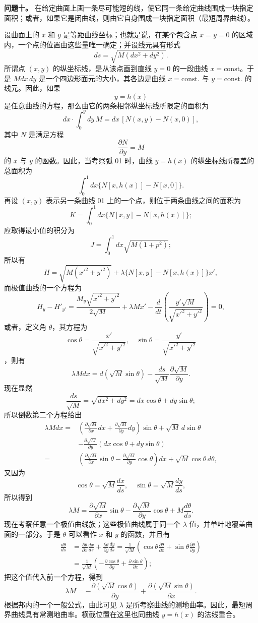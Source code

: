 \documentclass[11pt,a4paper,leqno]{article}
\begin{document}
\medskip
\noindent\textbf{问题十。} 在给定曲面上画一条尽可能短的线，使它同一条给定曲线围成一块指定面积；或者，如果它是闭曲线，则由它自身围成一块指定面积（最短周界曲线）。

设曲面上的 $x$ 和 $y$ 是等距曲线坐标；也就是说，在某个包含点 $x=y=0$ 的区域内，一个点的位置由这些量唯一确定；并设线元具有形式
\[
ds=\sqrt{M(dx^2+dy^2)}.
\]
所谓点 $(x,y)$ 的纵坐标线，是从该点画到直线 $y=0$ 的一段曲线 $x=\mathrm{const}$。于是 $Mdx\,dy$ 是一个四边形面元的大小，其各边是曲线 $x=\mathrm{const}.$ 与 $y=\mathrm{const}.$ 的线元。因此，如果
\[
y=h(x)
\]
是任意曲线的方程，那么由它的两条相邻纵坐标线所限定的面积为
\[
dx\cdot\int_0^ydy\,M=dx\,[N(x,y)-N(x,0)],
\]
其中 $N$ 是满足方程
\[
\frac{\partial N}{\partial y}=M
\]
的 $x$ 与 $y$ 的函数。因此，当考察弧 01 时，曲线 $y=h(x)$ 的纵坐标线所覆盖的总面积为
\[
\int_0^1dx\{N[x,h(x)]-N[x,0]\}.
\]
再设 $(x,y)$ 表示另一条曲线 01 上的一个点，则位于两条曲线之间的面积为
\[
K=\int_0^1dx\{N[x,y]-N[x,h(x)]\};
\]
应取得最小值的积分为
\[
J=\int_0^1dx\sqrt{M(1+p^2)};
\]
所以有
\[
H=\sqrt{M(x'^2+y'^2)}+\lambda\{N[x,y]-N[x,h(x)]\}x',
\]
而极值曲线的一个方程为
\[
H_y-H'_{y'}=\frac{M_y\sqrt{x'^2+y'^2}}{2\sqrt{M}}+
\lambda Mx'-\frac{d}{dt}\left(\frac{y'\sqrt{M}}{\sqrt{x'^2+y'^2}}\right)=0,
\]
或者，定义角 $\theta$，其方程为
\[
\cos\theta=\frac{x'}{\sqrt{x'^2+y'^2}},
\quad
\sin\theta=\frac{y'}{\sqrt{x'^2+y'^2}}
\]
，则有
\[
\lambda Mdx=d(\sqrt{M}\sin\theta)-\frac{ds}{\sqrt{M}}\frac{\partial\sqrt{M}}{\partial y}.
\]
现在显然
\[
\frac{ds}{\sqrt{M}}=\sqrt{dx^2+dy^2}=dx\cos\theta+dy\sin\theta;
\]
所以倒数第二个方程给出
\[
\begin{aligned}
\lambda Mdx={}&\left(\frac{\partial\sqrt{M}}{\partial x}dx+\frac{\partial\sqrt{M}}{\partial y}dy\right)\sin\theta
+\sqrt{M}\,d\sin\theta\\
&-\frac{\partial\sqrt{M}}{\partial y}(dx\cos\theta+dy\sin\theta)\\
={}&\left(\frac{\partial\sqrt{M}}{\partial x}\sin\theta-\frac{\partial\sqrt{M}}{\partial y}\cos\theta\right)dx+
\sqrt{M}\cos\theta\,d\theta,
\end{aligned}
\]
又因为
\[
\cos\theta=\sqrt{M}\frac{dx}{ds},
\quad
\sin\theta=\sqrt{M}\frac{dy}{ds},
\]
所以得到
\[
\lambda M=\frac{\partial\sqrt{M}}{\partial x}\sin\theta-
\frac{\partial\sqrt{M}}{\partial y}\cos\theta+M\frac{d\theta}{ds}.
\]
现在考察任意一个极值曲线族；这些极值曲线属于同一个 $\lambda$ 值，并单叶地覆盖曲面的一部分。于是 $\theta$ 可以看作 $x$ 和 $y$ 的函数，并且有
\[
\begin{aligned}
\frac{d\theta}{ds}&=\frac{\partial\theta}{\partial x}\frac{dx}{ds}+
\frac{\partial\theta}{\partial y}\frac{dy}{ds}
=\frac{1}{\sqrt{M}}\left(\cos\theta\frac{\partial\theta}{\partial x}+
\sin\theta\frac{\partial\theta}{\partial y}\right)\\
&=\frac{1}{\sqrt{M}}\left(-\frac{\partial\cos\theta}{\partial y}+
\frac{\partial\sin\theta}{\partial x}\right);
\end{aligned}
\]
把这个值代入前一个方程，得到
\[
\lambda M=-\frac{\partial(\sqrt{M}\cos\theta)}{\partial y}+
\frac{\partial(\sqrt{M}\sin\theta)}{\partial x}.
\]
根据邦内的一个一般公式，由此可见 $\lambda$ 是所考察曲线的测地曲率。因此，最短周界曲线具有常测地曲率。横截位置在这里也同曲线 $y=h(x)$ 的法线重合。
\end{document}
